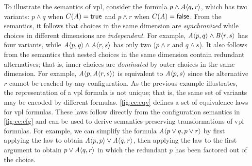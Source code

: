 To illustrate the semantics of \ac{vpl}, consider the formula
$p\wedge\chc[A]{q,r}$, which has two variants: $p\wedge q$ when $C(A)=\true$
and $p\wedge r$ when $C(A)=\false$.
%
From the semantics, it follows that choices in the same dimension are
\emph{synchronized} while choices in different dimensions are
\emph{independent}. For example, $\chc[A]{p,q}\wedge\chc[B]{r,s}$ has four
variants, while $\chc[A]{p,q}\wedge\chc[A]{r,s}$ has only two ($p\wedge r$ and
$q\wedge s$).
%
It also follows from the semantics that nested choices in the same dimension
contain redundant alternatives; that is, inner choices are \emph{dominated} by
outer choices in the same dimension. For example, $\chc[A]{p,\chc[A]{r,s}}$ is
equivalent to $\chc[A]{p,s}$ since the alternative $r$ cannot be reached by any
configuration.
%
As the previous example illustrates, the representation of a \ac{vpl} formula is
not unique; that is, the same set of variants may be encoded by different
formulas. \autoref{fig:cc:eqv} defines a set of equivalence laws for
\ac{vpl} formulas. These laws follow directly from the configuration semantics in
\autoref{fig:cc:cfg} and can be used to derive semantics-preserving
transformations of \ac{vpl} formulas.
%
For example, we can simplify the formula $\chc[A]{p\vee q, p\vee r}$ by first
applying the  law to obtain $\chc[A]{p,p}\vee\chc[A]{q,r}$, then applying
the  law to the first argument to obtain $p\vee\chc[A]{q,r}$ in which
the redundant $p$ has been factored out of the choice.
%

